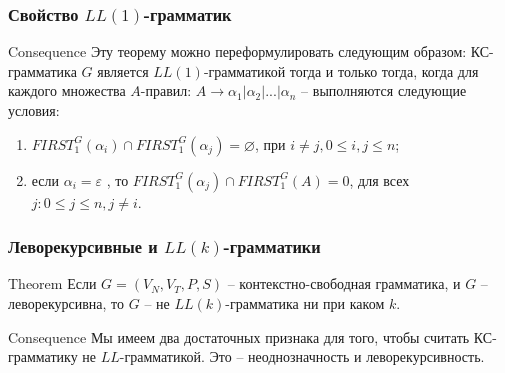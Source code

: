 \documentclass{beamer}
\begin{document}
\begin{frame}
	\transwipe[direction=90]
	\transwipe[direction=90]
	\frametitle{Свойство $LL(1)$-грамматик}
	\begin{block}{Consequence}
		Эту теорему можно переформулировать следующим образом: КС-грамматика $G$ является $LL(1)$-грамматикой тогда и только тогда, когда для каждого множества $A$-правил: $A \rightarrow \alpha_1 |\alpha_2 |...|\alpha_n$ -- выполняются следующие условия:
        \begin{enumerate}
            \item $FIRST_1^G (\alpha_i ) \cap FIRST_1^G (\alpha_j ) = \varnothing$, при $i \neq j , 0 \leq i , j \leq n$;
            \item если $\alpha_i = \varepsilon$ , то $FIRST_1^G (\alpha_j ) \cap FIRST_1^G (A) = 0$, для всех $j : 0 \leq j \leq n, j \neq i$.
        \end{enumerate}
	\end{block}	
\end{frame}

\begin{frame}
	\transwipe[direction=90]
	\frametitle{Леворекурсивные и $LL(k )$-грамматики}
	\begin{block}{Theorem}
		Если $G = (V_N , V_T , P , S )$ -- контекстно-свободная грамматика, и $G$ – леворекурсивна, то $G$ -- не $LL(k )$-грамматика ни при каком $k$.
	\end{block}
	\pause
	\begin{block}{Consequence}
		Мы имеем два достаточных признака для того, чтобы считать КС-грамматику не $LL$-грамматикой. Это -- неоднозначность и леворекурсивность.
	\end{block}
\end{frame}
\end{document}
